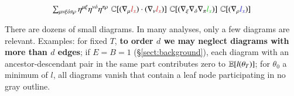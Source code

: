                    $$\sixsum \eta^{\mu\xi} \eta^{\nu\omicron} \eta^{\pi\rho} \, \ww{(\rRr{\AAA l_x}) \cdot (\rRr{\BBB l_x})}       \ww{(\gGg{\CCC \DDD \EEE l_x})} \ww{(\bBb{     \FFF l_x})}$$

            There are dozens of small diagrams.  In many analyses, only a few
            diagrams are relevant.  Examples: for fixed $T$, \textbf{to order
            $d$ we may neglect diagrams with more than $d$ edges};
            if $E=B=1$ (\S\ref{sect:background}), each diagram with an ancestor-descendant pair in the
            same part contributes zero to $\mathbb{E}[l(\theta_T)]$; for $\theta_0$ a minimum of
            $l$, all diagrams vanish that contain a leaf node
            participating in no gray outline.%

